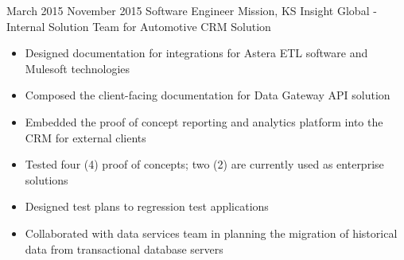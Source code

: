 \Experience
{March 2015}
{November 2015}
{Software Engineer}
{Mission, KS}
{Insight Global - Internal Solution Team for Automotive CRM Solution}
{
    \begin{itemize}
        \item Designed documentation for integrations for Astera ETL software
        and Mulesoft technologies
        \item Composed the client-facing documentation for Data Gateway API
        solution
        \item Embedded the proof of concept reporting and analytics platform
        into the CRM for external clients
        \item Tested four (4) proof of concepts; two (2) are currently used as
        enterprise solutions
        \item Designed test plans to regression test applications
        \item Collaborated with data services team in planning the migration of
        historical data from transactional database servers
    \end{itemize}
}